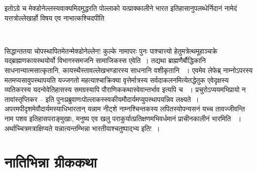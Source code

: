 इतोऽग्रे च मेक्डोनेल्लस्यवाक्यमिदमुद्धरति पोल्लाको यत्प्राक्कालीने भारत इतिहासानुपलब्धेर्निदानं नामेदं यत्तत्रोल्लेखार्हो विषय एव नाभात्कश्चिदपीति

\begin{myquote}

~\hfill {}
\end{myquote}

सिद्धान्ततया चोपस्थापितमेतन्मेक्डोनेल्लेन! कुल्के  नामापरः पुनः पाश्चात्त्यो हेतुमत्रेत्थमूहाञ्चक्रे यद्ब्राह्मणकायस्थयोर्यो विभागस्समजनि सामाजिकस्स एवेति~। तद्यथा ब्राह्मणैर्बौद्धिकानि साधनान्यात्मसात्कृतानि, कायस्थैस्तावल्लेखभण्डारस्य  साधनानि वशीकृतानि ~। एवमेव लेफेब्र्  नाम्नोऽपरस्य मतमप्यसावुपस्थापयति यज्जगतो महत्याश्चाक्रिक्या वृत्तेर्मात्रस्य सर्वदाकलनमित्येतद्धेतुक एवेदृक्षस्य व्यतिकरस्य यदन्वेवेतिहासस्य समग्रस्यापि पौराणिककथास्वेवान्तर्भाव इत्यपि च ~। प्रचुरोऽप्ययमभिप्रायो न तावांस्तृप्तिकर – इति पुनःप्रब्रुवाणःपोल्लाकस्स्वकीयमौदार्यमप्युपस्थापयन्निव लक्ष्यते~। अपरमपीदृशमेवौदार्यमस्याधिभारतान् यन्नाम नीट्शे नाम्नश्चिन्तकस्य लपितस्योपन्यसनं यच्च तावज्जीवन्ति नाम पशव इतिहासपराङ्मुखाः, मनुष्य एव खलु पराकुर्यात्प्रतिक्षणमभिवर्धमानं प्राचीनकालीनं भारमिति ~। अर्थाच्चित्रमत्राक्षिप्यते यन्नात्यन्तम्भिन्ना भारतीयाश्चतुष्पाद्भ्य इति!~।

\section*{नातिभिन्ना ग्रीककथा}

